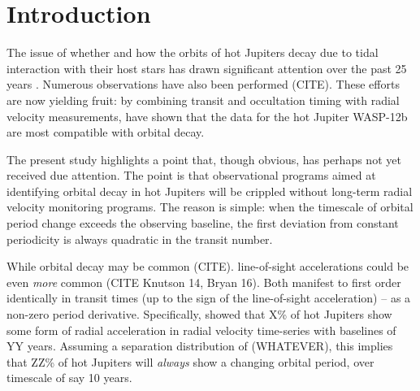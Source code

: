 \documentclass[12pt,twocolumn,tighten]{aastex62}
\begin{document}


\section{Introduction}

The issue of whether and how the orbits of hot Jupiters decay due to
tidal interaction with their host stars has drawn significant
attention over the past 25 years
\citep{rasio_tidal_1996,levrard_falling_2009,matsumura_tidal_2010}.
Numerous observations have also been performed (CITE).  These efforts
are now yielding fruit: by combining transit and occultation timing
with radial velocity measurements, \citet{yee_orbit_2020} have shown
that the data for the hot Jupiter WASP-12b are most compatible with
orbital decay.

The present study highlights a point that, though obvious, has perhaps
not yet received due attention.  The point is that observational
programs aimed at identifying orbital decay in hot Jupiters will be
crippled without long-term radial velocity monitoring programs.  The
reason is simple: when the timescale of orbital period change exceeds
the observing baseline, the first deviation from constant periodicity
is always quadratic in the transit number.

While orbital decay may be common (CITE).  line-of-sight accelerations
could be even {\it more} common (CITE Knutson 14, Bryan 16).  Both
manifest to first order identically in transit times (up to the sign
of the line-of-sight acceleration) -- as a non-zero period derivative.
Specifically, \citet{knutson_friends_2014} showed that X\% of hot
Jupiters show some form of radial acceleration in radial velocity
time-series with baselines of YY years.  Assuming a separation
distribution of (WHATEVER), this implies that ZZ\% of hot Jupiters
will {\it always} show a changing orbital period, over timescale of
say 10 years.

\end{document}
